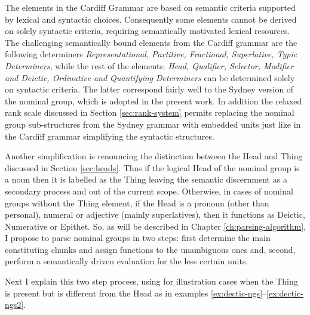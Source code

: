     The elements in the Cardiff Grammar are based on semantic criteria supported by lexical and syntactic choices. Consequently some elements cannot be derived on solely syntactic criteria, requiring semantically motivated lexical resources. The challenging semantically bound elements from the Cardiff grammar are the following determiners \textit{Representational, Partitive, Fractional, Superlative, Typic Determiners}, while the rest of the elements: \textit{Head, Qualifier, Selector, Modifier and Deictic, Ordinative and Quantifying Determiners} can be determined solely on syntactic criteria. The latter correspond fairly well to the Sydney version of the nominal group, which is adopted in the present work. In addition the relaxed rank scale discussed in Section \ref{sec:rank-system} permits replacing the nominal group sub-structures from the Sydney grammar with embedded units just like in the Cardiff grammar simplifying the syntactic structures.
	
    	
    Another simplification is renouncing the distinction between the Head and Thing \citep[390--396]{Halliday2013} discussed in Section \ref{sec:heads}. Thus if the logical Head of the nominal group is a noun then it is labelled as the Thing leaving the semantic discernment as a secondary process and out of the current scope. Otherwise, in cases of nominal groups without the Thing element, if the Head is a pronoun (other than personal), numeral or adjective (mainly superlatives), then it functions as Deictic, Numerative or Epithet. So, as will be described in Chapter \ref{ch:parsing-algorithm}, I propose to parse nominal groups in two steps: first determine the main constituting chunks and assign functions to the unambiguous ones and, second, perform a semantically driven evaluation for the less certain units. 
    	
    Next I explain this two step process, using for illustration cases when the Thing is present but is different from the Head as in examples \ref{ex:dectic-ngs}--\ref{ex:dectic-ngs2}.
    
